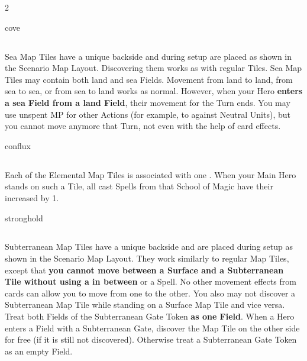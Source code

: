 \begin{multicols}{2}
\begin{expansion}{cove}
  \subsection*{}
  Sea Map Tiles have a unique backside and during setup are placed as shown in the Scenario Map Layout.
  Discovering them works as with regular Tiles.
  Sea Map Tiles may contain both land and sea Fields.
  Movement from land to land, from sea to sea, or from sea to land works as normal.
  However, when your Hero \textbf{enters a sea Field from a land Field}, their movement for the Turn ends.
  You may use unspent MP for other Actions (for example, to  against Neutral Units), but you cannot move anymore that Turn, not even with the help of card effects.
\end{expansion}

\bigskip

\begin{expansion}{conflux}
  \subsection*{}
  Each of the Elemental Map Tiles is associated with one .
  When your Main Hero stands on such a Tile, all cast Spells from that School of Magic have their  increased by 1.
\end{expansion}

\bigskip

\begin{expansion}{stronghold}
  \subsection*{}
  Subterranean Map Tiles have a unique backside and are placed during setup as shown in the Scenario Map Layout.
  They work similarly to regular Map Tiles, except that \textbf{you cannot move between a Surface and a Subterranean Tile without using a  in between} or a  Spell.
  No other movement effects from cards can allow you to move from one to the other.
  You also may not discover a Subterranean Map Tile while standing on a Surface Map Tile and vice versa.
  Treat both Fields of the Subterranean Gate Token \textbf{as one Field}.
  When a Hero enters a Field with a Subterranean Gate, discover the Map Tile on the other side for free (if it is still not discovered).
  Otherwise treat a Subterranean Gate Token as an empty Field.
\end{expansion}
\columnbreak


\end{multicols}
